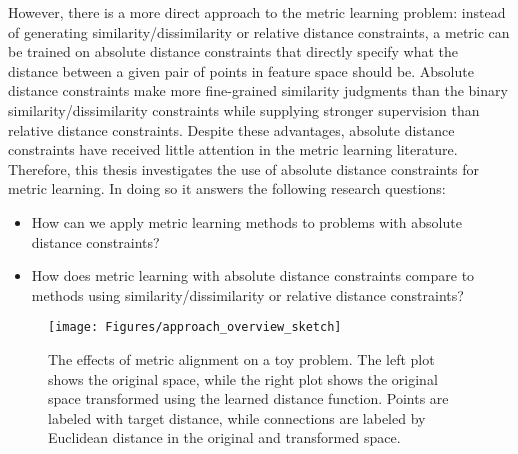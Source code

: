 However, there is a more direct approach to the metric learning problem: instead of generating similarity/dissimilarity or relative distance constraints, a metric can be trained on absolute distance constraints that directly specify what the distance between a given pair of points in feature space should be. Absolute distance constraints make more fine-grained similarity judgments than the binary similarity/dissimilarity constraints while supplying stronger supervision than relative distance constraints. Despite these advantages, absolute distance constraints have received little attention in the metric learning literature. Therefore, this thesis investigates the use of absolute distance constraints for metric learning. In doing so it answers the following research questions:
\begin{itemize}
\item How can we apply metric learning methods to problems with absolute distance constraints?
\item How does metric learning with absolute distance constraints compare to methods using similarity/dissimilarity or relative distance constraints?
\end{itemize}

\begin{figure}[t]
\begin{center}
\texttt{[image: Figures/approach\_overview\_sketch]}
\caption{The effects of metric alignment on a toy problem. The left plot shows the original space, while the right plot shows the original space transformed using the learned distance function. Points are labeled with target distance, while connections are labeled by Euclidean distance in the original and transformed space.}
\label{fig:approach_overview}
\end{center}
\end{figure}

